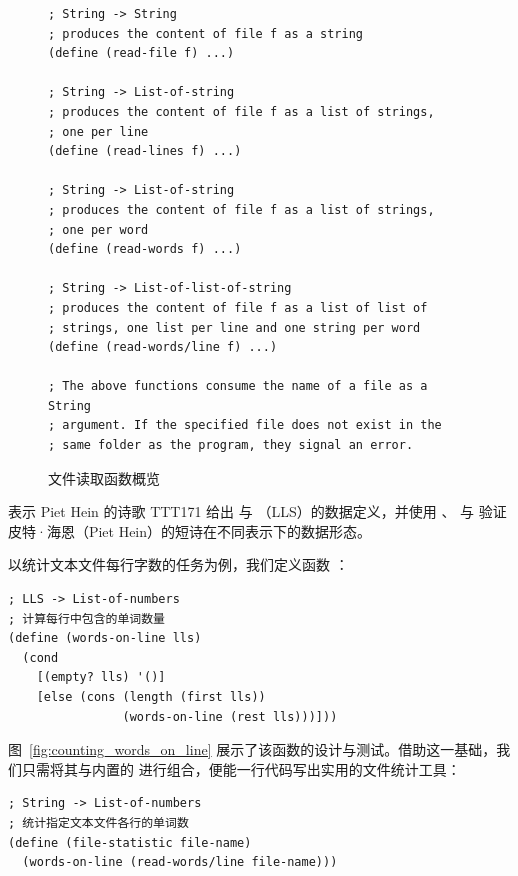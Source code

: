 \begin{figure}[htbp]
  \centering
\begin{lstlisting}[language=BSL, basicstyle=\scriptsize\ttfamily]
; String -> String
; produces the content of file f as a string
(define (read-file f) ...)

; String -> List-of-string
; produces the content of file f as a list of strings,
; one per line
(define (read-lines f) ...)

; String -> List-of-string
; produces the content of file f as a list of strings,
; one per word
(define (read-words f) ...)

; String -> List-of-list-of-string
; produces the content of file f as a list of list of
; strings, one list per line and one string per word
(define (read-words/line f) ...)

; The above functions consume the name of a file as a String
; argument. If the specified file does not exist in the
; same folder as the program, they signal an error.
\end{lstlisting}
  \caption{文件读取函数概览}
  \label{fig:reading_files}
\end{figure}

\begin{exercise}{表示 Piet Hein 的诗歌 TTT}{171}
给出  与 （LLS）的数据定义，并使用 、 与  验证皮特·海恩（Piet Hein）的短诗在不同表示下的数据形态。
\end{exercise}

以统计文本文件每行字数的任务为例，我们定义函数 ：
\begin{lstlisting}[language=BSL]
; LLS -> List-of-numbers
; 计算每行中包含的单词数量
(define (words-on-line lls)
  (cond
    [(empty? lls) '()]
    [else (cons (length (first lls))
                (words-on-line (rest lls)))]))
\end{lstlisting}

图~\ref{fig:counting_words_on_line} 展示了该函数的设计与测试。借助这一基础，我们只需将其与内置的  进行组合，便能一行代码写出实用的文件统计工具：
\begin{lstlisting}[language=BSL]
; String -> List-of-numbers
; 统计指定文本文件各行的单词数
(define (file-statistic file-name)
  (words-on-line (read-words/line file-name)))
\end{lstlisting}

